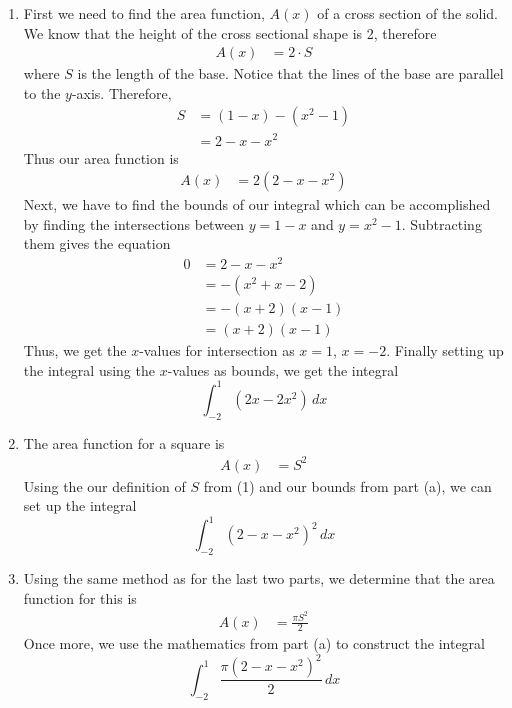 \documentclass{article}
\begin{document}
\begin{enumerate}[label=\textbf{(8.\arabic*)}]

\begin{enumerate}
\item First we need to find the area function, $A(x)$ of a cross section of the solid. We know that the height of the cross sectional shape is 2, therefore
\begin{align*}
A(x) &= 2\cdot S
\end{align*}
where $S$ is the length of the base. Notice that the lines of the base are parallel to the $y$-axis. Therefore,
\begin{align}
S &= (1-x)-(x^2-1)\\
&= 2-x-x^2
\end{align}
Thus our area function is 
\begin{align*}
A(x) &= 2(2-x-x^2)
\end{align*}
Next, we have to find the bounds of our integral which can be accomplished by finding the intersections between $y=1-x$ and $y=x^2-1$. Subtracting them gives the equation
\begin{align*}
0 &= 2-x-x^2\\
&= -\left(x^2+x-2\right)\\
&= -(x+2)(x-1)\\
&= (x+2)(x-1)
\end{align*}
Thus, we get the $x$-values for intersection as $x=1$, $x=-2$. Finally setting up the integral using the $x$-values as bounds, we get the integral
\[\int_{-2}^1\!\left(2x-2x^2\right)\,dx\]
\item The area function for a square is
\begin{align*}
A(x) &= S^2
\end{align*}
Using the our definition of $S$ from (1) and our bounds from part (a), we can set up the integral
\[\int_{-2}^1\!\left(2-x-x^2\right)^2\,dx\]
\item Using the same method as for the last two parts, we determine that the area function for this is 
\begin{align*}
A(x) &= \frac{\pi S^2}{2}
\end{align*}
Once more, we use the mathematics from part (a) to construct the integral
\[\int_{-2}^1\!\frac{\pi\left(2-x-x^2\right)^2}{2}\,dx\]
\end{enumerate}


\newpage


\end{enumerate}
\end{document}
